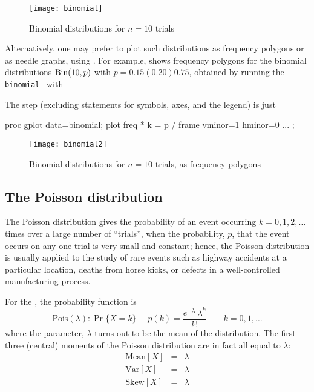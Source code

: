\begin{figure}[htb]
  \centering
  \texttt{[image: binomial]}
  \caption{Binomial distributions for $n=10$ trials}%
  \label{fig:binomial}
\end{figure}
Alternatively, one may prefer to plot such distributions as frequency
polygons or as needle graphs, using .
For example,  shows frequency polygons for
the binomial distributions $\Bin(10,p)$ with $p = 0.15 (0.20) 0.75$,
obtained by running the \texttt{binomial} \Dstp\ with
\begin{listing}
\end{listing}
The  step (excluding statements for symbols, axes, and the
legend) is just
\begin{listing}
proc gplot data=binomial;
   plot freq * k = p / frame vminor=1 hminor=0 ... ;
\end{listing}

\begin{figure}[htb]
  \centering
  \texttt{[image: binomial2]}
  \caption{Binomial distributions for $n=10$ trials, as frequency polygons}%
  \label{fig:binomial2}
\end{figure}

\subsection{The Poisson distribution}

The Poisson distribution gives the probability of an event occurring
$k = 0, 1, 2, \dots$ times over a large number of ``trials'',
when the probability, $p$, that the event occurs on any one
trial is very small and constant;
hence, the Poisson distribution is usually applied to the study of
rare events such as highway accidents at a particular location,
deaths from horse kicks, or defects in a well-controlled manufacturing
process.

For the , the probability function
is
\begin{equation}\label{eq:poisf}
\textrm{Pois}(\lambda):\Pr \{ X = k \} \equiv p (k)=
  \frac{ e^{ - \lambda } \:  \lambda^k } { k ! }
  \quad\quad k = 0, 1, \dots
\end{equation}
where the parameter, $\lambda$ turns out to be the mean of the
distribution.
The first three (central) moments of the Poisson distribution are
in fact all equal to $\lambda$:
\begin{eqnarray*}
\textrm{Mean}[X] & = & \lambda \\
\textrm{Var}[X] &  = & \lambda \\
\textrm{Skew}[X] & = & \lambda 
\end{eqnarray*}


